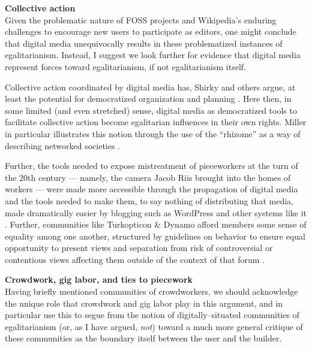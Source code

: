 \documentclass[11pt,titlepage]{article}
\newcommand{\sectitle}[1]{\textbf{#1}\\}
\begin{document}
\sectitle{Collective action}
Given the problematic nature of FOSS projects
and Wikipedia's enduring challenges to encourage new users to participate as editors,
one might conclude that
digital media unequivocally results in these problematized instances of egalitarianism.
Instead, I suggest we look further for evidence that
digital media represent forces toward egalitarianism, if not egalitarianism itself.

Collective action coordinated by digital media has,
Shirky and others argue,
at least the potential for democratized organization and planning
\cite{shirky2008here,costanza2014out}.
Here then, in some limited (and even stretched) sense,
digital media as democratized tools to facilitate collective action become
egalitarian influences in their own rights.
Miller in particular illustrates this notion through the use of the ``rhizome''
as a way of describing networked societies
\cite{miller2011understanding}.

Further, the tools needed to expose mistreatment of pieceworkers at the turn of the 20th century
--- namely, the camera Jacob Riis brought into the homes of workers ---
were made more accessible through the propagation of digital media and the tools needed to make them,
to say nothing of distributing that media,
made dramatically easier by blogging such as WordPress and other systems like it
\cite{riisOtherSideLives,facesOfMechanicalTurk}.
Further,
communities like Turkopticon \& Dynamo afford members some sense of equality among one another,
structured by guidelines on behavior to ensure equal opportunity to present views and
separation from risk of controversial or contentious views affecting them
outside of the context of that forum
\cite{turkopticon,dynamo}.















\sectitle{Crowdwork, gig labor, and ties to piecework}
Having briefly mentioned communities of crowdworkers,
we should acknowledge the unique role that crowdwork and gig labor play in this argument,
and in particular use this to segue from the notion of digitally--situated communities of egalitarianism
(or, as I have argued, \textit{not}) toward a much more general critique of
these communities as the boundary itself between the user and the builder.
\end{document}

